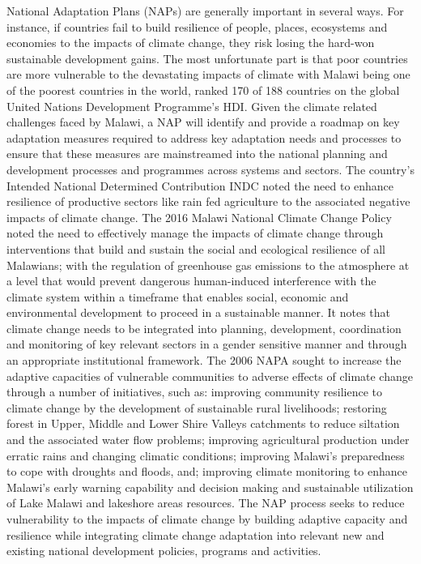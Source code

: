 \documentclass[
]{book}
\begin{document}
National Adaptation Plans (NAPs) are generally important in several ways. For instance, if countries fail to build resilience of people, places, ecosystems and economies to the impacts of climate change, they risk losing the hard-won sustainable development gains. The most unfortunate part is that poor countries are more vulnerable to the devastating impacts of climate with Malawi being one of the poorest countries in the world, ranked 170 of 188 countries on the global United Nations Development Programme's HDI. Given the climate related challenges faced by Malawi, a NAP will identify and provide a roadmap on key adaptation measures required to address key adaptation needs and processes to ensure that these measures are mainstreamed into the national planning and development processes and programmes across systems and sectors. The country's Intended National Determined Contribution INDC noted the need to enhance resilience of productive sectors like rain fed agriculture to the associated negative impacts of climate change. The 2016 Malawi National Climate Change Policy noted the need to effectively manage the impacts of climate change through interventions that build and sustain the social and ecological resilience of all Malawians; with the regulation of greenhouse gas emissions to the atmosphere at a level that would prevent dangerous human-induced interference with the climate system within a timeframe that enables social, economic and environmental development to proceed in a sustainable manner. It notes that climate change needs to be integrated into planning, development, coordination and monitoring of key relevant sectors in a gender sensitive manner and through an appropriate institutional framework. The 2006 NAPA sought to increase the adaptive capacities of vulnerable communities to adverse effects of climate change through a number of initiatives, such as: improving community resilience to climate change by the development of sustainable rural livelihoods; restoring forest in Upper, Middle and Lower Shire Valleys catchments to reduce siltation and the associated water flow problems; improving agricultural production under erratic rains and changing climatic conditions; improving Malawi's preparedness to cope with droughts and floods, and; improving climate monitoring to enhance Malawi's early warning capability and decision making and sustainable utilization of Lake Malawi and lakeshore areas resources. The NAP process seeks to reduce vulnerability to the impacts of climate change by building adaptive capacity and resilience while integrating climate change adaptation into relevant new and existing national development policies, programs and activities.
\end{document}
